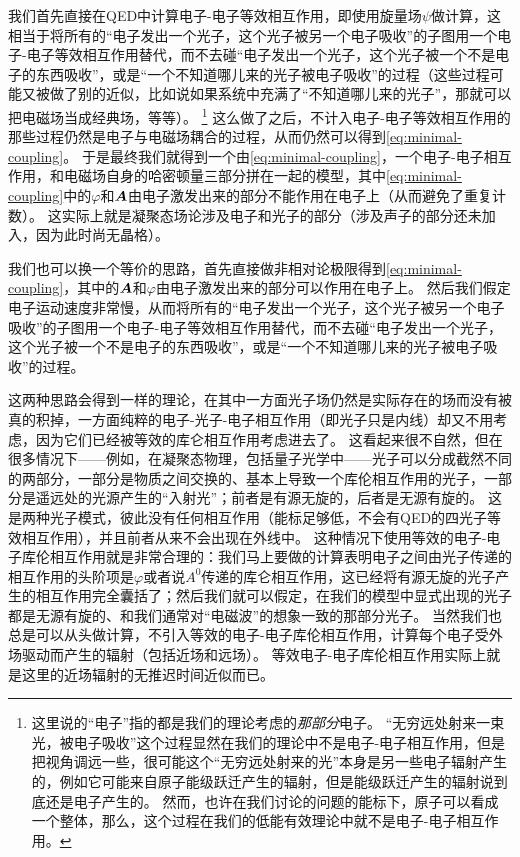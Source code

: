 我们首先直接在QED中计算电子-电子等效相互作用，即使用旋量场$\psi$做计算，这相当于将所有的“电子发出一个光子，这个光子被另一个电子吸收”的子图用一个电子-电子等效相互作用替代，而不去碰“电子发出一个光子，这个光子被一个不是电子的东西吸收”，或是“一个不知道哪儿来的光子被电子吸收”的过程（这些过程可能又被做了别的近似，比如说如果系统中充满了“不知道哪儿来的光子”，那就可以把电磁场当成经典场，等等）。%
\footnote{
    这里说的“电子”指的都是我们的理论考虑的\emph{那部分}电子。
    “无穷远处射来一束光，被电子吸收”这个过程显然在我们的理论中不是电子-电子相互作用，但是把视角调远一些，很可能这个“无穷远处射来的光”本身是另一些电子辐射产生的，例如它可能来自原子能级跃迁产生的辐射，但是能级跃迁产生的辐射说到底还是电子产生的。
    然而，也许在我们讨论的问题的能标下，原子可以看成一个整体，那么，这个过程在我们的低能有效理论中就不是电子-电子相互作用。
}%
这么做了之后，不计入电子-电子等效相互作用的那些过程仍然是电子与电磁场耦合的过程，从而仍然可以得到\eqref{eq:minimal-coupling}。
于是最终我们就得到一个由\eqref{eq:minimal-coupling}，一个电子-电子相互作用，和电磁场自身的哈密顿量三部分拼在一起的模型，其中\eqref{eq:minimal-coupling}中的$\varphi$和$\vb*{A}$由电子激发出来的部分不能作用在电子上（从而避免了重复计数）。
这实际上就是凝聚态场论涉及电子和光子的部分（涉及声子的部分还未加入，因为此时尚无晶格）。

我们也可以换一个等价的思路，首先直接做非相对论极限得到\eqref{eq:minimal-coupling}，其中的$\vb*{A}$和$\varphi$由电子激发出来的部分可以作用在电子上。
然后我们假定电子运动速度非常慢，从而将所有的“电子发出一个光子，这个光子被另一个电子吸收”的子图用一个电子-电子等效相互作用替代，而不去碰“电子发出一个光子，这个光子被一个不是电子的东西吸收”，或是“一个不知道哪儿来的光子被电子吸收”的过程。

这两种思路会得到一样的理论，在其中一方面光子场仍然是实际存在的场而没有被真的积掉，一方面纯粹的电子-光子-电子相互作用（即光子只是内线）却又不用考虑，因为它们已经被等效的库仑相互作用考虑进去了。
这看起来很不自然，但在很多情况下——例如，在凝聚态物理，包括量子光学中——光子可以分成截然不同的两部分，一部分是物质之间交换的、基本上导致一个库伦相互作用的光子，一部分是遥远处的光源产生的“入射光”；前者是有源无旋的，后者是无源有旋的。
这是两种光子模式，彼此没有任何相互作用（能标足够低，不会有QED的四光子等效相互作用），并且前者从来不会出现在外线中。
这种情况下使用等效的电子-电子库伦相互作用就是非常合理的：我们马上要做的计算表明电子之间由光子传递的相互作用的头阶项是$\varphi$或者说$A^0$传递的库仑相互作用，这已经将有源无旋的光子产生的相互作用完全囊括了；然后我们就可以假定，在我们的模型中显式出现的光子都是无源有旋的、和我们通常对“电磁波”的想象一致的那部分光子。
当然我们也总是可以从头做计算，不引入等效的电子-电子库伦相互作用，计算每个电子受外场驱动而产生的辐射（包括近场和远场）。
等效电子-电子库伦相互作用实际上就是这里的近场辐射的无推迟时间近似而已。

